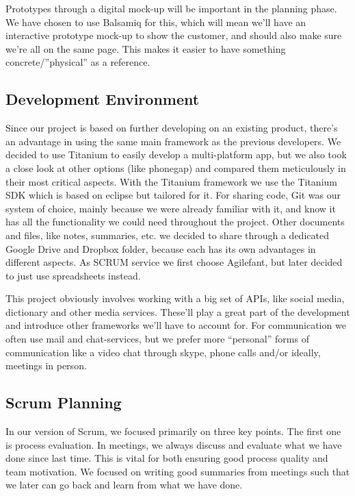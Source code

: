 Prototypes through a digital mock-up will be important in the planning phase. We have chosen to use Balsamiq for this, which will mean we’ll have an interactive prototype mock-up to show the customer, and should also make sure we're all on the same page. This makes it easier to have something concrete/”physical” as a reference.

\subsection{Development Environment}

Since our project is based on further developing on an existing product, there’s an advantage in using the same main framework as the previous developers. We decided to use Titanium to easily develop a multi-platform app, but we also took a close look at other options (like phonegap) and compared them meticulously in their most critical aspects. With the Titanium framework we use the Titanium SDK which is based on eclipse but tailored for it. For sharing code, Git was our system of choice, mainly because we were already familiar with it, and know it has all the functionality we could need throughout the project. Other documents and files, like notes, summaries, etc. we decided to share through a dedicated Google Drive and Dropbox folder, because each has its own advantages in different aspects. As SCRUM service we first choose Agilefant, but later decided to just use spreadsheets instead.

This project obviously involves working with a big set of APIs, like social media, dictionary and other media services. These’ll play a great part of the development and introduce other frameworks we’ll have to account for. For communication we often use mail and chat-services, but we prefer more “personal” forms of communication like a video chat through skype, phone calls and/or ideally, meetings in person.

\subsection{Scrum Planning}
In our version of Scrum, we focused primarily on three key points. The first one is process evaluation. In meetings, we always discuss and evaluate what we have done since last time. This is vital for both ensuring good process quality and team motivation. We focused on writing good summaries from meetings such that we later can go back and learn from what we have done.

